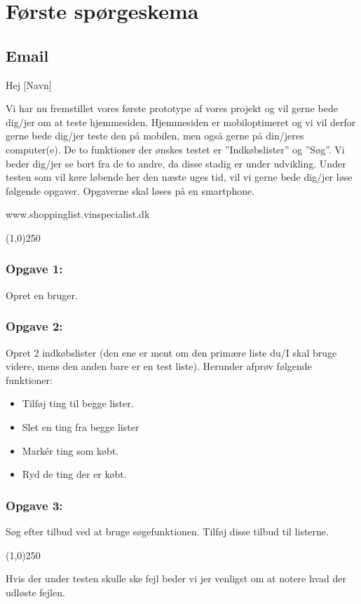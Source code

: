 \chapter{Første spørgeskema}
\label{chap:foesteskema}
\section*{Email}
Hej [Navn]

Vi har nu fremstillet vores første prototype af vores projekt og vil gerne bede dig/jer om at teste hjemmesiden. Hjemmesiden er mobiloptimeret og vi vil derfor gerne bede dig/jer teste den på mobilen, men også gerne på din/jeres computer(e). De to funktioner der ønskes testet er ”Indkøbslister” og ”Søg”. Vi beder dig/jer se bort fra de to andre, da disse stadig er under udvikling. 
Under testen som vil køre løbende her den næste uges tid, vil vi gerne bede dig/jer løse følgende opgaver. Opgaverne skal løses på en smartphone.

www.shoppinglist.vinspecialist.dk
\begin{center}
\line(1,0){250}
\end{center}

\subsection*{Opgave 1:}
Opret en bruger.
\subsection*{Opgave 2:}
Opret 2 indkøbslister (den ene er ment om den primære liste du/I skal bruge videre, mens den anden bare er en test liste). Herunder afprøv følgende funktioner:
\begin{itemize}
\item Tilføj ting til begge lister.
\item Slet en ting fra begge lister
\item Markér ting som købt.
\item Ryd de ting der er købt.
\end{itemize}
\subsection*{Opgave 3:}
Søg efter tilbud ved at bruge søgefunktionen. Tilføj disse tilbud til listerne.
\begin{center}
\line(1,0){250}
\end{center}
Hvis der under testen skulle ske fejl beder vi jer venligst om at notere hvad der udløste fejlen.

